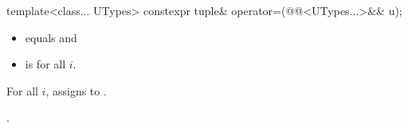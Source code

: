 \documentclass{wg21}
\begin{document}
%
\begin{itemdecl}
    template<class... UTypes> constexpr tuple& operator=(@@<UTypes...>&& u);
\end{itemdecl}

\begin{itemdescr}
    \pnum
    \constraints
    \begin{itemize}
        \item {} equals  and
        \item {} is  for all $i$.
    \end{itemize}
    
    \pnum
    \effects
    For all $i$, assigns  to
    .
    
    \pnum
    \returns
    .
\end{itemdescr}
\end{document}

